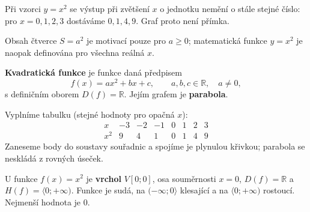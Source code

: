 \documentclass[11pt,a4paper]{article}
\begin{document}
Při vzorci $y=x^2$ se výstup při zvětšení $x$ o jednotku nemění o stále stejné číslo: pro $x=0,1,2,3$ dostáváme $0,1,4,9$. Graf proto není přímka.\par
Obsah čtverce $S=a^2$ je motivací pouze pro $a\ge0$; matematická funkce $y=x^2$ je naopak definována pro všechna reálná $x$.
\begin{definiceBox}[title={Definice - Kvadratická funkce}]
\textbf{Kvadratická funkce} je funkce daná předpisem
\[f(x)=ax^2+bx+c,\qquad a,b,c\in\mathbb R,\quad a\ne0,\]
s definičním oborem $D(f)=\mathbb R$. Jejím grafem je \textbf{parabola}.
\end{definiceBox}
Vyplníme tabulku (stejné hodnoty pro opačná $x$):
\[\begin{array}{c|rrrrrrr}x&-3&-2&-1&0&1&2&3\\\hline x^2&9&4&1&0&1&4&9\end{array}\]
Zaneseme body do soustavy souřadnic a spojíme je plynulou křivkou; parabola se neskládá z rovných úseček.
\begin{center}
\end{center}
\begin{definiceBox}[title={Věta - Vlastnosti funkce x na druhou}]
U funkce $f(x)=x^2$ je \textbf{vrchol} $V[0;0]$, osa souměrnosti $x=0$,
$D(f)=\mathbb R$ a $H(f)=\langle0;+\infty)$. Funkce je sudá, na $(-\infty;0\rangle$ klesající a na $\langle0;+\infty)$ rostoucí. Nejmenší hodnota je $0$.
\end{definiceBox}
\end{document}
